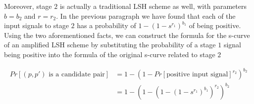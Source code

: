 Moreover, stage $2$ is actually a traditional LSH scheme as well, with parameters $b=b_2$ and $r=r_2$. In the previous paragraph we have found that each of the input signals to stage $2$ has a probability of  $1 - (1-s^{r_1})^{b_1}$ of being positive. Using the two aforementioned facts, we can construct the formula for the s-curve of an amplified LSH scheme by substituting the probability of a stage $1$ signal being positive into the formula of the original s-curve related to stage $2$

\begin{align}
    Pr[(p, p')\text{ is a candidate pair}] &= 1 - (1- Pr[\text{positive input signal}]^{r_2})^{b_2} \\
                                           &= 1 - (1- (1 - (1-s^{r_1})^{b_1})^{r_2})^{b_2} \nonumber
    \label{eq:amplified_s_curve}
\end{align}

